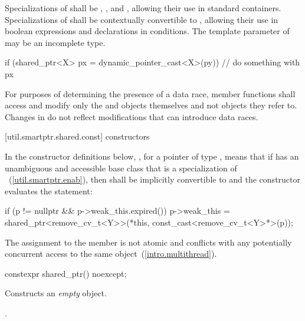 \pnum
Specializations of  shall be ,
, and , allowing their use in standard
containers. Specializations of  shall be
contextually convertible to ,
allowing their use in boolean expressions and declarations in conditions. The template
parameter  of  may be an incomplete type.

\pnum
\begin{example}
\begin{codeblock}
if (shared_ptr<X> px = dynamic_pointer_cast<X>(py)) {
  // do something with px
}
\end{codeblock}
\end{example}

\pnum
For purposes of determining the presence of a data race, member functions shall
access and modify only the  and  objects
themselves and not objects they refer to. Changes in  do not
reflect modifications that can introduce data races.

[util.smartptr.shared.const]{ constructors}

\pnum
In the constructor definitions below,
,
for a pointer  of type ,
means that if  has an unambiguous and accessible base class
that is a specialization of ~(\ref{util.smartptr.enab}),
then  shall be implicitly convertible to  and
the constructor evaluates the statement:
\begin{codeblock}
if (p != nullptr && p->weak_this.expired())
  p->weak_this = shared_ptr<remove_cv_t<Y>>(*this, const_cast<remove_cv_t<Y>*>(p));
\end{codeblock}
The assignment to the  member is not atomic and
conflicts with any potentially concurrent access to the same object~(\ref{intro.multithread}).

%
\begin{itemdecl}
constexpr shared_ptr() noexcept;
\end{itemdecl}

\begin{itemdescr}
\pnum\effects  Constructs an \textit{empty}  object.

\pnum\postconditions  {}.
\end{itemdescr}

